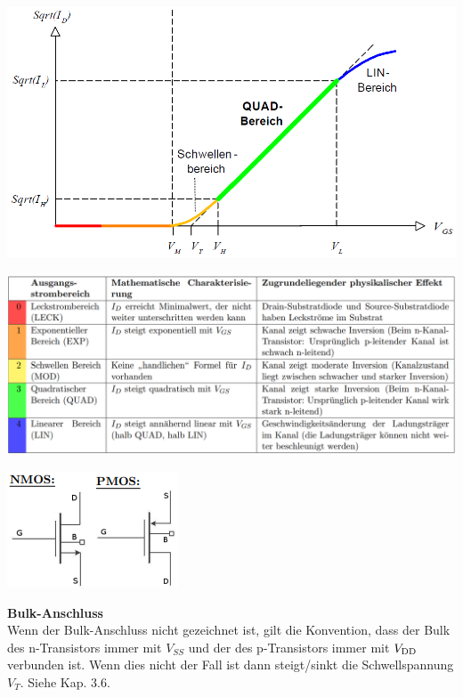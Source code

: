 \begin{minipage}{0.33\linewidth}
\includegraphics[width=1\linewidth]{Transferkennline_Sqrt.png}
\end{minipage}\newpage
\begin{minipage}{0.8\linewidth}
\includegraphics[width=1\linewidth]{Ausgangsstrombereiech.png}
\end{minipage}%
\begin{minipage}{0.2\linewidth}
\includegraphics[angle=90, width=0.8\linewidth]{Selbstsperrend MOS-Transistor.png}
\end{minipage}
\textbf{Bulk-Anschluss}\\
Wenn der Bulk-Anschluss nicht gezeichnet ist, gilt die Konvention, dass der Bulk des n-Transistors immer mit $V_{SS}$ und der des p-Transistors immer mit $V_{\rm DD}$ verbunden ist. Wenn dies nicht der Fall ist dann steigt/sinkt die Schwellspannung $V_T$. Siehe Kap. 3.6.
